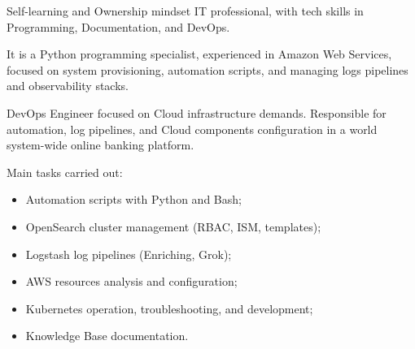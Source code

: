 \documentclass[10pt,a4paper]{altacv}
\begin{document}



\begin{fullwidth}
    \makecvheader
\end{fullwidth}



Self-learning and Ownership mindset IT professional, with tech skills in Programming, Documentation, and DevOps.

\bigskip

It is a Python programming specialist, experienced in Amazon Web Services, focused on system provisioning, automation scripts, and managing logs pipelines and observability stacks.



DevOps Engineer focused on Cloud infrastructure demands. Responsible for automation, log pipelines, and Cloud components configuration in a world system-wide online banking platform.

\bigskip

Main tasks carried out:

\bigskip

\begin{itemize}
    \item Automation scripts with Python and Bash;
    \item OpenSearch cluster management (RBAC, ISM, templates);
    \item Logstash log pipelines (Enriching, Grok);
    \item AWS resources analysis and configuration;
    \item Kubernetes operation, troubleshooting, and development;
    \item Knowledge Base documentation.
\end{itemize}    
\end{document}
